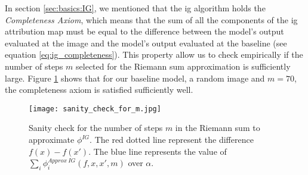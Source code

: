 In section \ref{sec:basics:IG}, we mentioned that the \gls{ig} algorithm holds the \textit{Completeness Axiom}, which means that the sum of all the components of the \gls{ig} attribution map must be equal to the difference between the model's output evaluated at the image and the model's output evaluated at the baseline (see equation \ref{eq:ig_completeness}). This property allow us to check empirically if the number of steps $m$ selected for the Riemann sum approximation is sufficiently large. Figure \ref{fig:VGIG_exp_set:m_sanity} shows that for our baseline model, a random image and $m=70$, the  completeness axiom is satisfied sufficiently well.

\begin{figure}[!ht]
  \centering
  \texttt{[image: sanity\_check\_for\_m.jpg]}
  \caption{Sanity check for the number of steps $m$ in the Riemann sum to approximate $\phi^{IG}$. The red dotted line represent the difference $f(x)-f(x')$. The blue line represents the value of $\sum_i \phi^{Approx\ IG}_i(f, x, x', m)$ over $\alpha$.}
  \label{fig:VGIG_exp_set:m_sanity}
\end{figure}

